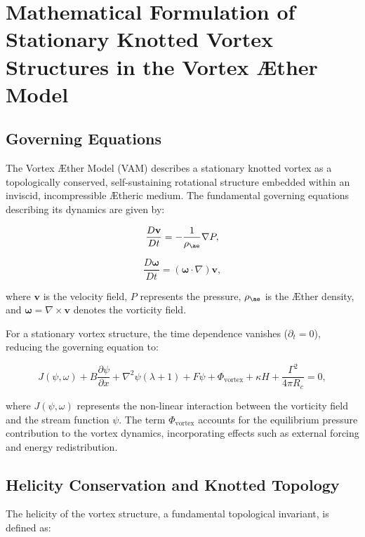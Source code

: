 
\section{Mathematical Formulation of Stationary Knotted Vortex Structures in the Vortex \AE ther Model}

\subsection{Governing Equations}
The Vortex \AE ther Model (VAM) describes a stationary knotted vortex as a topologically conserved, self-sustaining rotational structure embedded within an inviscid, incompressible \AE theric medium. The fundamental governing equations describing its dynamics are given by:

\begin{equation*}
\frac{D \mathbf{v}}{Dt} = -\frac{1}{\rho_{\ae}} \nabla P,
\end{equation*}

\begin{equation*}
\frac{D \boldsymbol{\omega}}{Dt} = (\boldsymbol{\omega} \cdot \nabla) \mathbf{v},
\end{equation*}

where $\mathbf{v}$ is the velocity field, $P$ represents the pressure, $\rho_{\ae}$ is the \AE ther density, and $\boldsymbol{\omega} = \nabla \times \mathbf{v}$ denotes the vorticity field.

For a stationary vortex structure, the time dependence vanishes ($\partial_t = 0$), reducing the governing equation to:

\begin{equation*}
J(\psi, \omega) + B \frac{\partial \psi}{\partial x} + \nabla^2 \psi (\lambda + 1) + F \psi + \Phi_{\text{vortex}} + \kappa H + \frac{\Gamma^2}{4 \pi R_c} = 0,
\end{equation*}

where $J(\psi, \omega)$ represents the non-linear interaction between the vorticity field and the stream function $\psi$. The term $\Phi_{\text{vortex}}$ accounts for the equilibrium pressure contribution to the vortex dynamics, incorporating effects such as external forcing and energy redistribution.

\subsection{Helicity Conservation and Knotted Topology}
The helicity of the vortex structure, a fundamental topological invariant, is defined as:

